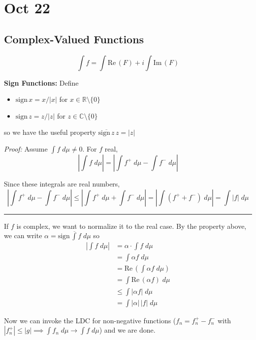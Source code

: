 \documentclass[12pt]{report}
\newcommand{\R}{\mathbb{R}}
\newcommand{\C}{\mathbb{C}}
\newcommand{\abs}[1]{\left\vert #1 \right\vert}
\renewcommand{\L}{\text{L}}
\renewcommand{\div}{\vspace*{10pt}\hrule\vspace*{10pt}}
\renewcommand{\bar}[1]{\overline{#1}}
\renewcommand{\Re}{\text{Re}\,}
\renewcommand{\Im}{\text{Im}\,}
\newcommand{\sign}{\text{sign}\,}
\newcommand*{\tbf}[1]{\ifmmode\mathbf{#1}\else\textbf{#1}\fi}
\newenvironment*{tbox}[2][gray]{
    \begin{tcolorbox}[
        parbox=false,
        colback=#1!5!white,
        colframe=#1!75!black,
        breakable,
        title={#2}
    ]}
    {\end{tcolorbox}}
\begin{document}
\section*{Oct 22}
    \subsection*{Complex-Valued Functions}
        \[\int f = \int \Re(F) + i \int \Im(F)\]

        \tbf{Sign Functions:} Define
        \begin{itemize}
            \item $\sign x = x/\abs{x}$ for $x \in \R\setminus \{0\}$ 
            \item $\sign z = z/\abs{z}$ for $z \in \C\setminus \{0\}$
        \end{itemize}
        so we have the useful property $\bar{\sign z} \, z = \abs{z}$

        \begin{tbox}{\textbf{Lemma:} If $f \in \L^1$, then $\abs{\int f \; d\mu} \leq \int \abs{f} \; d\mu$}
            \emph{Proof:} Assume $\int f \; d\mu \neq 0$. For $f$ real, 
            \[\abs{\int f \; d\mu} = \abs{\int f^+ \; d\mu - \int f^- \; d\mu} \] 

            Since these integrals are real numbers, 
            \[\abs{\int f^+ \; d\mu - \int f^- \; d\mu} \leq \abs{\int f^+ \; d\mu + \int f^- \; d\mu} = \abs{\int (f^+ + f^-) \; d\mu} = \int \abs{f} \; d\mu\]

            \div 

            If $f$ is complex, we want to normalize it to the real case. By the property above, we can write $\alpha = \bar{\sign \int f \; d\mu}$ so
            \begin{align*}
                \abs{\int f \; d\mu} &= \alpha \cdot \int f \; d\mu\\ 
                    &= \int \alpha f \; d\mu\\ 
                    &= \Re\left(\int \alpha f \; d\mu\right)\\ 
                    &= \int \Re(\alpha f) \; d\mu\\ 
                    &\leq \int \abs{\alpha f} \; d\mu\\
                    &= \int \abs{\alpha}\, \abs{f}\; d\mu
            \end{align*}

            Now we can invoke the LDC for non-negative functions ($f_n = f^+_n - f^-_n$ with $\abs{f_n^+} \leq \abs{g} \implies \int f_n \; d\mu \to \int f \; d\mu$) and we are done.
        \end{tbox}
\end{document}
